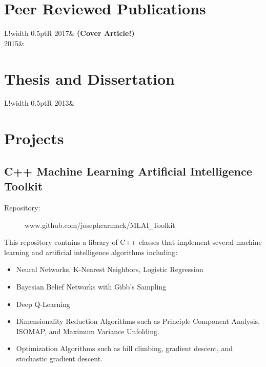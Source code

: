 \documentclass[10pt]{article}
\newcommand\VRule{\color{lightgray}\vrule width 0.5pt}
\begin{document}


\section*{Peer Reviewed Publications}
\begin{tabular}{L!{\VRule}R}
    2017& {\bf(Cover Article!)}\\
    2015&
\end{tabular}

\section*{Thesis and Dissertation}
\begin{tabular}{L!{\VRule}R}
    2013&
\end{tabular}

\section*{Projects}

\subsection{C++ Machine Learning Artificial Intelligence Toolkit}
\begin{description}
    \item[Repository:] www.github.com/josephcarmack/MLAI\texttt{\_}Toolkit
\end{description}
This repository contains a library of C++ classes that implement several
machine learning and artificial intelligence algorithms including:
\begin{itemize}
    \itemsep-0.5em
    \item Neural Networks, K-Nearest Neighbors, Logistic Regression
    \item Bayesian Belief Networks with Gibb's Sampling
    \item Deep Q-Learning
    \item Dimensionality Reduction Algorithms such as Principle Component
        Analysis, ISOMAP, and Maximum Variance Unfolding.
    \item Optimization Algorithms such as hill climbing, gradient descent,
        and stochastic gradient descent.
\end{itemize}
\end{document}
